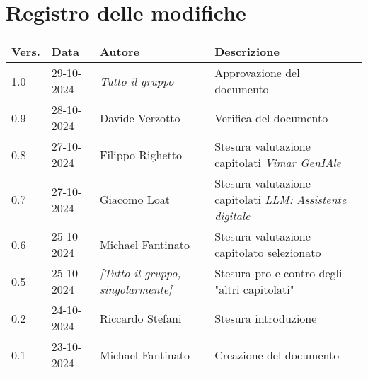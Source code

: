 \section*{Registro delle modifiche}

\begin{table}[h]
    \centering
    \begin{tabular}{|l|l|p{3cm}|p{5cm}|}
        \hline
        \rowcolor[gray]{0.9}
        \textbf{Vers.} & \textbf{Data} & \textbf{Autore} & \textbf{Descrizione}\\
        \hline
        1.0 & 29-10-2024 & \emph{Tutto il gruppo} & Approvazione del documento\\
        \hline
        0.9 & 28-10-2024 & Davide Verzotto & Verifica del documento\\
        \hline
        0.8 & 27-10-2024 & Filippo Righetto & Stesura valutazione capitolati \emph{Vimar GenIAle}\\
        \hline
        0.7 & 27-10-2024 & Giacomo Loat & Stesura valutazione capitolati \emph{LLM: Assistente digitale}\\
        \hline
        0.6 & 25-10-2024 & Michael Fantinato & Stesura valutazione capitolato selezionato\\
        \hline
        0.5 & 25-10-2024 & \emph{[Tutto il gruppo, singolarmente]} & Stesura pro e contro degli "altri capitolati"\\
        \hline
        0.2 & 24-10-2024 & Riccardo Stefani & Stesura introduzione\\
        \hline
        0.1 & 23-10-2024 & Michael Fantinato & Creazione del documento\\
        \hline
    \end{tabular}
\end{table}

